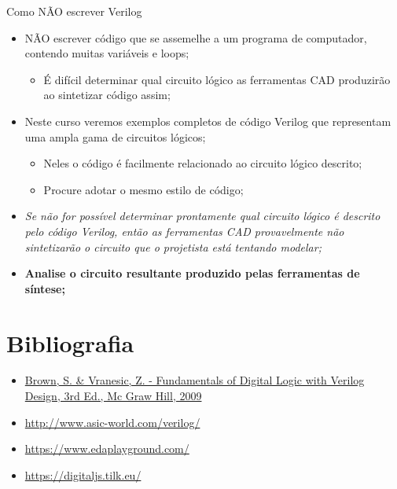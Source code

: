 \begin{frame}{Como NÃO escrever Verilog}
    \begin{itemize}
        \item NÃO escrever código que se assemelhe a um programa de computador, contendo muitas variáveis e loops; 
        \begin{itemize}
            \item É difícil determinar qual circuito lógico as ferramentas CAD produzirão ao sintetizar código assim;
        \end{itemize}
        \item Neste curso veremos exemplos completos de código Verilog que representam uma ampla gama de circuitos lógicos; 
        \begin{itemize}
            \item Neles o código é facilmente relacionado ao circuito lógico descrito;
            \item Procure adotar o mesmo estilo de código;
        \end{itemize}
        \item \emph{Se não for possível determinar prontamente qual circuito lógico é descrito pelo código Verilog, então as ferramentas CAD provavelmente não sintetizarão o circuito que o projetista está tentando modelar;}
        \item \textbf{Analise o circuito resultante produzido pelas ferramentas de síntese; }
    \end{itemize}
\end{frame}

\section{Bibliografia} %

\begin{frame}{\insertsection} 
	\begin{itemize}
		\item \href{https://www.google.com.br/search?q=filetype\%3Apdf+Fundamentals+of+Digital+Logic+with+Verilog+Design+&oq=filetype\%3Apdf}{Brown, S. \& Vranesic, Z. - Fundamentals of Digital Logic with Verilog Design, 3rd Ed., Mc Graw Hill, 2009}
		\item \href{http://www.asic-world.com/verilog/}{http://www.asic-world.com/verilog/}
		\item \href{https://www.edaplayground.com/}{https://www.edaplayground.com/}
            \item \url{https://digitaljs.tilk.eu/}
	\end{itemize}
\end{frame}

\begin{frame}
	\titlepage
\end{frame} 

